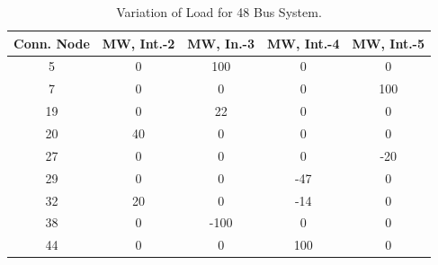 \documentclass[preprint,12pt,3p]{elsarticle}
\begin{document}
\begin{table}[ht] 

\caption{Variation of Load for 48 Bus System.} %

\centering %

\begin{tabular}{| c | c | c | c | c |} %

\hline\hline %

Conn. Node & MW, Int.-2 & MW, In.-3 & MW, Int.-4  & MW, Int.-5 \\ [0.5ex] %


\hline %

5 &	0 &	100 &	0 &	0 \\ %
\hline
7 &	0 &	0 &	0 &	100 \\ %
\hline
19 &	0 &	22 &	0 &	0 \\ %
\hline
20 &	40 &	0 &	0 &	0 \\ %
\hline
27 &	0 &	0 &	0 &	-20 \\ %
\hline
29 &	0 &	0 &	-47 &	0 \\ %
\hline
32 &	20 &	0 &	-14 &	0 \\ %
\hline
38 &	0 &	-100 &	0 &	0 \\ %
\hline
44 &	0 &	0 &	100 &	0 \\ %
\hline
\end{tabular} 

\label{table:48LASCOPFLoadModified} %

\end{table}
\end{document}
